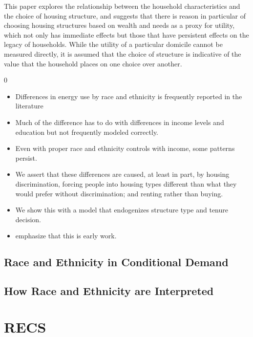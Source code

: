 \documentclass{article}
\begin{document}
This paper explores the relationship between the household characteristics and the choice of housing structure, and suggests that there is reason in particular of choosing housing structures based on wealth and needs as a proxy for utility, which not only has immediate effects but those that have persistent effects on the legacy of households.  While the utility of a particular domicile cannot be measured directly, it is assumed that the choice of structure is indicative of the value that the household places on one choice over another.  













0
\begin{itemize}

  \item Differences in energy use by race and ethnicity is frequently reported in the literature
  \item Much of the difference has to do with differences in income levels and education but not frequently modeled correctly.
  \item Even with proper race and ethnicity controls with income, some patterns persist.
  \item We assert that these differences are caused, at least in part, by housing discrimination, forcing people into housing types different than what they would prefer without discrimination; and renting rather than buying.
  \item We show this with a model that endogenizes structure type and tenure decision.
  \item emphasize that this is early work.
\end{itemize}





  \subsection{Race and Ethnicity in Conditional Demand}
  
  \subsection{How Race and Ethnicity are Interpreted}

\section{RECS}
\end{document}
